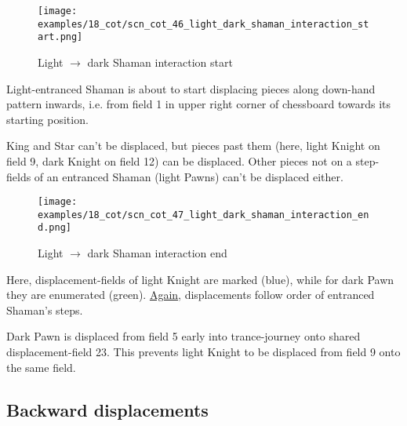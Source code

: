 \vspace*{-1.5\baselineskip}
\noindent
\begin{figure}[!h]
\texttt{[image: examples/18\_cot/scn\_cot\_46\_light\_dark\_shaman\_interaction\_start.png]}
\vspace*{-1.4\baselineskip}
\caption{Light $\rightarrow$ dark Shaman interaction start}
\label{fig:scn_cot_46_light_dark_shaman_interaction_start}
\end{figure}

\vspace*{-0.5\baselineskip}
Light-entranced Shaman is about to start displacing pieces along down-hand pattern
inwards, i.e. from field 1 in upper right corner of chessboard towards its starting
position.

King and Star can't be displaced, but pieces past them (here, light Knight on field 9,
dark Knight on field 12) can be displaced. Other pieces not on a step-fields of an
entranced Shaman (light Pawns) can't be displaced either.

\clearpage %

\noindent
\begin{figure}[!h]
\texttt{[image: examples/18\_cot/scn\_cot\_47\_light\_dark\_shaman\_interaction\_end.png]}
\caption{Light $\rightarrow$ dark Shaman interaction end}
\label{fig:scn_cot_47_light_dark_shaman_interaction_end}
\end{figure}

Here, displacement-fields of light Knight are marked (blue), while for dark Pawn
they are enumerated (green).
\hyperref[fig:scn_cot_39_light_light_shaman_interaction_end]{Again}, displacements
follow order of entranced Shaman's steps.

Dark Pawn is displaced from field 5 early into trance-journey onto shared
displacement-field 23. This prevents light Knight to be displaced from field 9
onto the same field.

\clearpage %

\subsection*{Backward displacements}
\label{sec:Conquest of Tlalocan/Trance-journey/Backward displacements}

